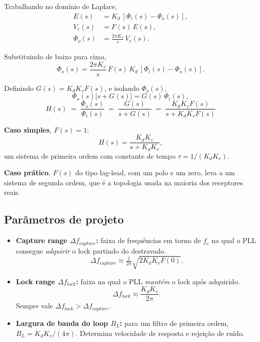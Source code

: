 \documentclass[11pt,a4paper]{article}
\begin{document}
\begin{quadro}
Trabalhando no domínio de Laplace,
\begin{align*}
  E(s) &= K_d\,[\Phi_i(s) - \Phi_o(s)],\\
  V_c(s) &= F(s)\,E(s),\\
  \Phi_o(s) &= \frac{2\pi K_v}{s}\,V_c(s).
\end{align*}

Substituindo de baixo para cima,
\[
  \Phi_o(s) = \frac{2\pi K_v}{s}\,F(s)\,K_d\,[\Phi_i(s) - \Phi_o(s)].
\]

Definindo $G(s) = K_d K_v F(s)$, e isolando $\Phi_o(s)$,
\[
  \Phi_o(s)\bigl[s + G(s)\bigr] = G(s)\,\Phi_i(s),
\]
\[
  \boxed{\;H(s) \;=\; \frac{\Phi_o(s)}{\Phi_i(s)} \;=\; \frac{G(s)}{s+G(s)} \;=\; \frac{K_d K_v F(s)}{s+K_d K_v F(s)}\;}
\]

\textbf{Caso simples}, $F(s)=1$:
\[
  H(s) = \frac{K_d K_v}{s + K_d K_v},
\]
um sistema de primeira ordem com constante de tempo $\tau = 1/(K_d K_v)$.

\textbf{Caso prático}, $F(s)$ do tipo lag-lead, com um polo e um zero, leva a um sistema de segunda ordem, que é a topologia usada na maioria dos receptores reais.
\end{quadro}

\subsection{Parâmetros de projeto}

\begin{itemize}
  \item \textbf{Capture range $\Delta f_{capture}$:} faixa de frequências em torno de $f_c$ na qual o PLL consegue \emph{adquirir} o lock partindo do destravado.
  \[ \Delta f_{capture} \approx \tfrac{1}{2\pi}\sqrt{2K_d K_v F(0)}.\]

  \item \textbf{Lock range $\Delta f_{lock}$:} faixa na qual o PLL \emph{mantém} o lock após adquirido.
  \[ \Delta f_{lock} \approx \frac{K_d K_v}{2\pi}.\]
  Sempre vale $\Delta f_{lock} > \Delta f_{capture}$.

  \item \textbf{Largura de banda do loop $B_L$:} para um filtro de primeira ordem, $B_L = K_d K_v / (4\pi)$. Determina velocidade de resposta e rejeição de ruído.
\end{itemize}
\end{document}
